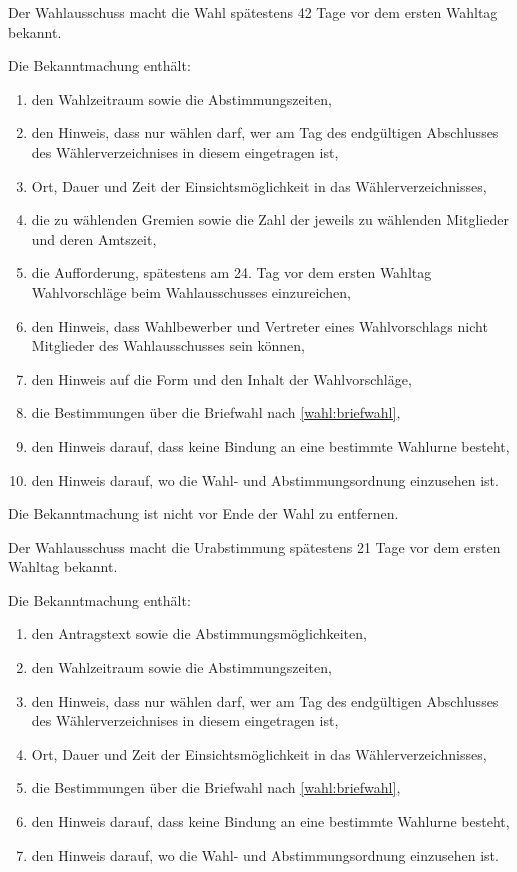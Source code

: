 \begin{jurdoc}
\label{wahl:bekanntmachung-wahl}
Der Wahlausschuss macht die Wahl spätestens 42 Tage vor dem ersten Wahltag bekannt.

Die Bekanntmachung enthält:
\begin{enumerate}
     \item den Wahlzeitraum sowie die Abstimmungszeiten,
     \item den Hinweis, dass nur wählen darf, wer am Tag des endgültigen Abschlusses des Wählerverzeichnises in diesem eingetragen ist,
     \item Ort, Dauer und Zeit der Einsichtsmöglichkeit in das Wählerverzeichnisses,
     \item die zu wählenden Gremien sowie die Zahl der jeweils zu wählenden Mitglieder und deren Amtszeit,
     \item die Aufforderung, spätestens am 24. Tag vor dem ersten Wahltag Wahlvorschläge beim Wahlausschusses einzureichen, 
     \item den Hinweis, dass Wahlbewerber und Vertreter eines Wahlvorschlags nicht Mitglieder des Wahlausschusses sein können,
     \item den Hinweis auf die Form und den Inhalt der Wahlvorschläge,
     \item die Bestimmungen über die Briefwahl nach \ref{wahl:briefwahl},
     \item den Hinweis darauf, dass keine Bindung an eine bestimmte Wahlurne besteht,
     \item den Hinweis darauf, wo die Wahl- und Abstimmungsordnung einzusehen ist.
\end{enumerate}

Die Bekanntmachung ist nicht vor Ende der Wahl zu entfernen.

\label{wahl:bekanntmachung-ua}
Der Wahlausschuss macht die Urabstimmung spätestens 21 Tage vor dem ersten Wahltag bekannt.

Die Bekanntmachung enthält:
\begin{enumerate}
     \item den Antragstext sowie die Abstimmungsmöglichkeiten,
     \item den Wahlzeitraum sowie die Abstimmungszeiten,
     \item den Hinweis, dass nur wählen darf, wer am Tag des endgültigen Abschlusses des Wählerverzeichnises in diesem eingetragen ist,
     \item Ort, Dauer und Zeit der Einsichtsmöglichkeit in das Wählerverzeichnisses,
     \item die Bestimmungen über die Briefwahl nach \ref{wahl:briefwahl},
     \item den Hinweis darauf, dass keine Bindung an eine bestimmte Wahlurne besteht,
     \item den Hinweis darauf, wo die Wahl- und Abstimmungsordnung einzusehen ist.
\end{enumerate}


\end{jurdoc}
